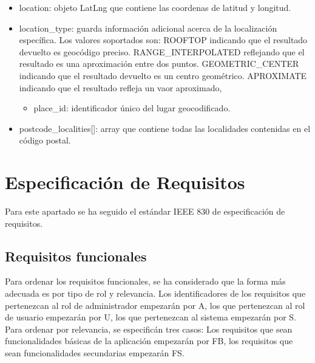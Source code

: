 \begin{itemize}

\item location: objeto LatLng que contiene las coordenas de latitud y longitud.

\item location\_type: guarda información adicional acerca de la localización específica. Los valores soportados son: ROOFTOP indicando que el resultado devuelto es geocódigo preciso. RANGE\_INTERPOLATED reflejando que el resultado es una aproximación entre dos puntos. GEOMETRIC\_CENTER indicando que el resultado devuelto es un centro geométrico. APROXIMATE indicando que el resultado refleja un vaor aproximado,

\begin{itemize}

\item place\_id: identificador único del lugar geocodificado.


\end{itemize}

\item postcode\_localities[]: array que contiene todas las localidades contenidas en el código postal.

\end{itemize}

\section{Especificación de Requisitos}

Para este apartado se ha seguido el estándar IEEE 830 de especificación de requisitos.

\subsection{Requisitos funcionales}

Para ordenar los requisitos funcionales, se ha considerado que la forma más adecuada es por tipo de rol y relevancia. Los identificadores de los requisitos que pertenezcan al rol de administrador empezarán por A, los que pertenezcan al rol de usuario empezarán por U, los que pertenezcan al sistema empezarán por S. Para ordenar por relevancia, se especificán tres casos: Los requisitos que sean funcionalidades básicas de la aplicación empezarán por FB, los requisitos que sean funcionalidades secundarias empezarán FS.

\vspace{5 mm}


